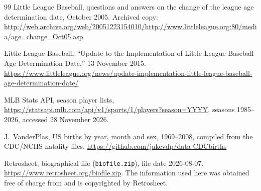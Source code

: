 \documentclass[11pt]{article}
\begin{document}
\begin{thebibliography}{99}
 Little League Baseball, questions and answers on the change of the league age determination date, October 2005. Archived copy: \url{http://web.archive.org/web/20051223154010/http://www.littleleague.org:80/media/age_change_Oct05.asp}

 Little League Baseball, ``Update to the Implementation of Little League Baseball Age Determination Date,'' 13 November 2015. \url{https://www.littleleague.org/news/update-implementation-little-league-baseball-age-determination-date/}

 MLB Stats API, season player lists, \url{https://statsapi.mlb.com/api/v1/sports/1/players?season=YYYY}, seasons 1985--2026, accessed 28 November 2026.

 J.~VanderPlas, US births by year, month and sex, 1969--2008, compiled from the CDC/NCHS natality files. \url{https://github.com/jakevdp/data-CDCbirths}

 Retrosheet, biographical file (\texttt{biofile.zip}), file date 2026-08-07. \url{https://www.retrosheet.org/biofile.zip}. The information used here was obtained free of charge from and is copyrighted by Retrosheet.

\end{thebibliography}
\end{document}
